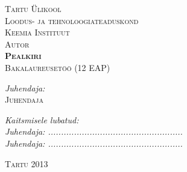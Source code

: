 \begin{titlepage}
\begin{center}

\textsc{Tartu Ülikool}\\
\textsc{Loodus- ja tehnoloogiateaduskond}\\
\textsc{Keemia Instituut}\\[3.5cm]

{\large\textsc{Autor}}\\[0.2cm]
{\Large
\textsc{\bfseries 
Pealkiri}}\\[0.2cm]
\textsc{Bakalaureusetöö (12 EAP)}\\[3.2cm]

\begin{flushright} 
\emph{Juhendaja:} \\
\textsc{Juhendaja}
\end{flushright}

\vspace{3cm}
\begin{flushleft} 
\emph{Kaitsmisele lubatud:}\\[0.5cm]
\emph{Juhendaja: ....................................................}\\[0.5cm]
\emph{Juhendaja: ....................................................}\\
\end{flushleft}

\vspace{1.5cm}
\textsc{Tartu 2013}%

\end{center}
\end{titlepage}